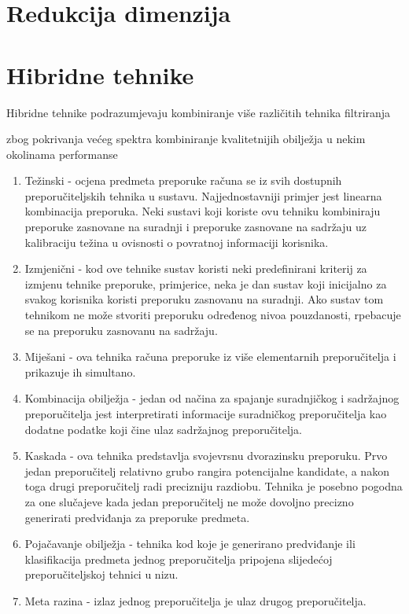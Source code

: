 \documentclass[times, utf8, diplomski, numeric]{fer}
\begin{document}
\section{Redukcija dimenzija}


\section{Hibridne tehnike}
Hibridne tehnike podrazumjevaju kombiniranje više različitih tehnika filtriranja

zbog pokrivanja većeg spektra
kombiniranje kvalitetnijih obilježja u nekim okolinama
performanse

\begin{enumerate}
  \item Težinski - ocjena predmeta preporuke računa se iz svih dostupnih
  preporučiteljskih tehnika u sustavu. Najjednostavniji primjer jest linearna
  kombinacija preporuka. Neki sustavi koji koriste ovu tehniku kombiniraju
  preporuke zasnovane na suradnji i preporuke zasnovane na sadržaju uz
  kalibraciju težina u ovisnosti o povratnoj informaciji korisnika.
  \item Izmjenični - kod ove tehnike sustav koristi neki predefinirani kriterij
  za izmjenu tehnike preporuke, primjerice, neka je dan sustav koji inicijalno
  za svakog korisnika koristi preporuku zasnovanu na suradnji. Ako sustav tom
  tehnikom ne može stvoriti preporuku određenog nivoa pouzdanosti, rpebacuje se
  na preporuku zasnovanu na sadržaju.
  \item Miješani - ova tehnika računa preporuke iz više elementarnih
  preporučitelja i prikazuje ih simultano.
  \item Kombinacija obilježja - jedan od načina za spajanje suradnjičkog i
  sadržajnog preporučitelja jest interpretirati informacije suradničkog
  preporučitelja kao dodatne podatke koji čine ulaz sadržajnog preporučitelja.
  \item Kaskada - ova tehnika predstavlja svojevrsnu dvorazinsku preporuku. Prvo
  jedan preporučitelj relativno grubo rangira potencijalne kandidate, a nakon
  toga drugi preporučitelj radi precizniju razdiobu. Tehnika je posebno pogodna
  za one slučajeve kada jedan preporučitelj ne može dovoljno precizno generirati
  predviđanja za preporuke predmeta.
  \item Pojačavanje obilježja - tehnika kod koje je generirano predviđanje ili
  klasifikacija predmeta jednog preporučitelja pripojena slijedećoj
  preporučiteljskoj tehnici u nizu.
  \item Meta razina - izlaz jednog preporučitelja je ulaz drugog preporučitelja.
\end{enumerate}
\end{document}
